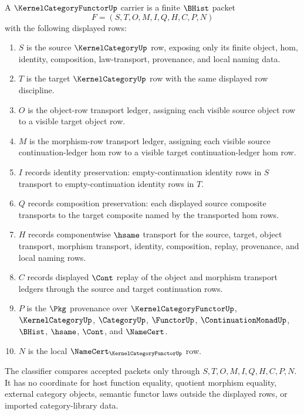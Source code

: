 \begin{definition}
\label{def:kernel-category-functor-carrier}
A $\KernelCategoryFunctorUp$ carrier is a finite $\BHist$ packet
$$
F=(S,T,O,M,I,Q,H,C,P,N)
$$
with the following displayed rows:
\begin{enumerate}
\item $S$ is the source $\KernelCategoryUp$ row, exposing only its finite object, hom, identity, composition, law-transport, provenance, and local naming data.
\item $T$ is the target $\KernelCategoryUp$ row with the same displayed row discipline.
\item $O$ is the object-row transport ledger, assigning each visible source object row to a visible target object row.
\item $M$ is the morphism-row transport ledger, assigning each visible source continuation-ledger hom row to a visible target continuation-ledger hom row.
\item $I$ records identity preservation: empty-continuation identity rows in $S$ transport to empty-continuation identity rows in $T$.
\item $Q$ records composition preservation: each displayed source composite transports to the target composite named by the transported hom rows.
\item $H$ records componentwise $\hsame$ transport for the source, target, object transport, morphism transport, identity, composition, replay, provenance, and local naming rows.
\item $C$ records displayed $\Cont$ replay of the object and morphism transport ledgers through the source and target continuation rows.
\item $P$ is the $\Pkg$ provenance over $\KernelCategoryFunctorUp$, $\KernelCategoryUp$, $\CategoryUp$, $\FunctorUp$, $\ContinuationMonadUp$, $\BHist$, $\hsame$, $\Cont$, and $\NameCert$.
\item $N$ is the local $\NameCert_{\KernelCategoryFunctorUp}$ row.
\end{enumerate}
The classifier compares accepted packets only through $S,T,O,M,I,Q,H,C,P,N$. It has no coordinate for host function equality, quotient morphism equality, external category objects, semantic functor laws outside the displayed rows, or imported category-library data.
\end{definition}

